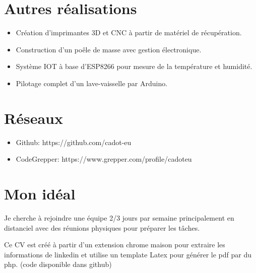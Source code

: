 \documentclass[letterpaper]{twentysecondcv} %
\begin{document}
\section{Autres réalisations}
\begin{itemize}
	\item Création d'imprimantes 3D et CNC à partir de matériel de récupération.
\item Construction d'un poêle de masse avec gestion électronique.
\item Système IOT à base d'ESP8266 pour mesure de la température et humidité.
\item Pilotage complet d'un lave-vaisselle par Arduino.

  \end{itemize}





\section{Réseaux}

\begin{itemize}
	\item Github: https://github.com/cadot-eu
\item CodeGrepper: https://www.grepper.com/profile/cadoteu

  \end{itemize}

\section{Mon idéal}

Je cherche à rejoindre une équipe 2/3 jours par semaine principalement en distanciel avec des réunions physiques pour préparer les tâches. 

{\scriptsize Ce CV est créé à partir d'un extension chrome maison pour extraire les informations de linkedin et utilise un template Latex pour générer le pdf par du php. (code disponible dans github)}


\end{document}

